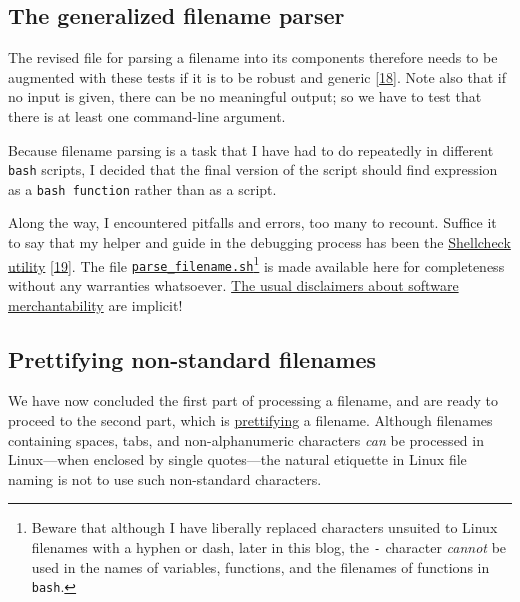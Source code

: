 \documentclass[
  a4paper,
]{article}
\begin{document}
\hypertarget{the-generalized-filename-parser}{%
\subsection{The generalized filename
parser}\label{the-generalized-filename-parser}}

The revised file for parsing a filename into its components therefore
needs to be augmented with these tests if it is to be robust and generic
{[}\protect\hyperlink{ref-caveats}{18}{]}. Note also that if no input is
given, there can be no meaningful output; so we have to test that there
is at least one command-line argument.

Because filename parsing is a task that I have had to do repeatedly in
different \texttt{bash} scripts, I decided that the final version of the
script should find expression as a \texttt{bash\ function} rather than
as a script.

Along the way, I encountered pitfalls and errors, too many to recount.
Suffice it to say that my helper and guide in the debugging process has
been the \href{https://www.shellcheck.net/}{Shellcheck utility}
{[}\protect\hyperlink{ref-shellcheck}{19}{]}. The file
\href{scripts/parse_filename.sh}{\texttt{parse\_filename.sh}}\footnote{Beware
  that although I have liberally replaced characters unsuited to Linux
  filenames with a hyphen or dash, later in this blog, the \texttt{-}
  character \emph{cannot} be used in the names of variables, functions,
  and the filenames of functions in \texttt{bash}.} is made available
here for completeness without any warranties whatsoever.
\href{https://core.ac.uk/download/pdf/267973227.pdf}{The usual
disclaimers about software merchantability} are implicit!
 \normalfont

\hypertarget{prettifying-non-standard-filenames}{%
\subsection{Prettifying non-standard
filenames}\label{prettifying-non-standard-filenames}}

We have now concluded the first part of processing a filename, and are
ready to proceed to the second part, which is
\href{https://www.thefreedictionary.com/prettifying}{prettifying} a
filename. Although filenames containing spaces, tabs, and
non-alphanumeric characters \emph{can} be processed in Linux---when
enclosed by single quotes---the natural etiquette in Linux file naming
is not to use such non-standard characters.
\end{document}
